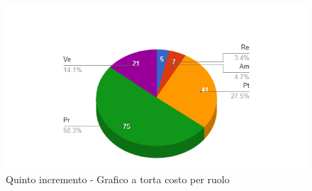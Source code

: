 {{\begin{longtable}{C{.4\freewidth} C{.2\freewidth} C{.2\freewidth} C{.2\freewidth} C{.2\freewidth} C{.2\freewidth} C{.2\freewidth} C{.2\freewidth} C{.2\freewidth}}
        \end{longtable}
        \begin{figure}[H]
          \includegraphics[width=15cm]{sezioni/images/quintoT.png}
          \centering
          \caption{Quinto incremento - Grafico a torta costo per ruolo}
       \end{figure}
    }
    }

